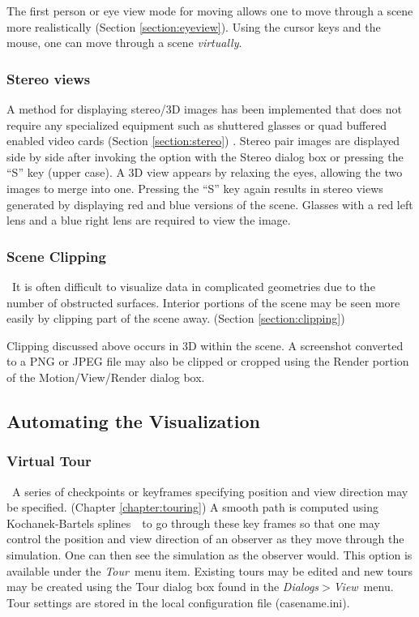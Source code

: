 \documentclass[11pt,twoside]{book}
\begin{document}
The first person or eye view mode for moving
allows one to move through a scene more
realistically (Section \ref{section:eyeview}).  Using the cursor keys and the
mouse, one can move through a scene {\em virtually}.

\subsubsection{Stereo views}A method for displaying stereo/3D
images has been implemented that does
not require any specialized equipment such as shuttered glasses or
quad buffered enabled video cards (Section \ref{section:stereo}) .
Stereo pair images are displayed side by side after invoking the option with
the Stereo dialog box or pressing the ``S'' key (upper case).
A 3D view appears by relaxing the eyes, allowing the two images to merge into one.
Pressing the ``S'' key again results in stereo views generated by
displaying red and blue versions of the scene.
Glasses with a red left lens and a blue right lens are required to view the image.

\subsubsection{Scene Clipping}\ It is often difficult to visualize data
in complicated geometries due to the number of obstructed
surfaces. Interior portions of the scene may be seen more easily
by clipping part of the scene away. (Section
\ref{section:clipping})

Clipping discussed above occurs in 3D within the scene.  A
screenshot converted to a PNG or JPEG file may also be clipped or
cropped using the Render portion of the Motion/View/Render
dialog box.

\subsection{Automating the Visualization}
\subsubsection{Virtual Tour}\   A series of checkpoints or keyframes
specifying position and view direction may be specified. (Chapter
\ref{chapter:touring}) A smooth path is computed using
Kochanek-Bartels splines~\cite{moller:02}\ to go through these key
frames so that one may control the position and view direction of
an observer as they move through the simulation. One can then see
the simulation as the observer would. This option is available
under the {\em Tour}\ menu item. Existing tours may be edited and
new tours may be created using the Tour dialog box found in
the {\em Dialogs$>$View}\ menu. Tour settings are stored in the local
configuration file (casename.ini).
\end{document}
